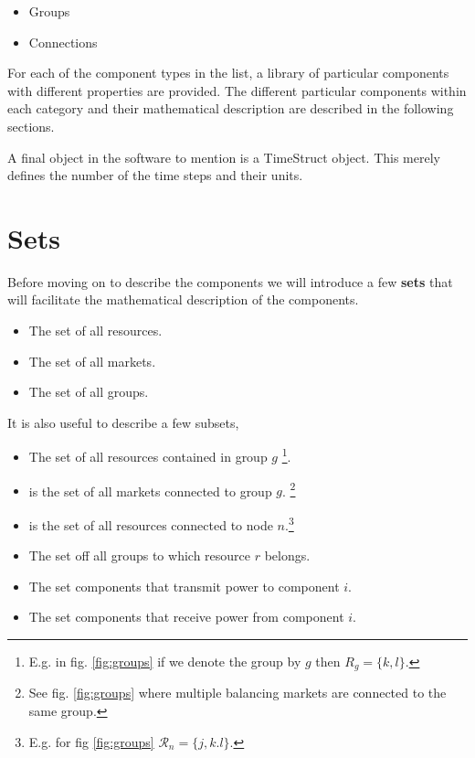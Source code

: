\documentclass[]{report}
\renewcommand{\emph}{\textbf}
\newcommand{\resources}{\mathcal{R}}
\newcommand{\resourcesg}{\mathcal{R}_g}
\newcommand{\resourcesn}{\mathcal{R}_n}
\newcommand{\componentsr}{\mathcal{C}_r}
\newcommand{\groups}{\mathcal{G}}
\newcommand{\groupsr}{\mathcal{G}_r}
\newcommand{\markets}{\mathcal{M}}
\newcommand{\marketsg}{\mathcal{M}_g}
\newcommand{\outputs}{\mathcal{O}}
\newcommand{\inputs}{\mathcal{I}}
\begin{document}
\begin{itemize}
    \item Groups 
    \item Connections
\end{itemize}

For each of the component types in the list, a library of particular components with different properties are provided. The different particular components within each category and their mathematical description are described in the following sections.

A final object in the software to mention is a TimeStruct object. This merely defines the number of the time steps and their units. 

\section{Sets}

Before moving on to describe the components we will introduce a few \emph{sets} that will facilitate the mathematical description of the components.

\begin{itemize}
    \item [$\resources$] The set of all resources.
    \item [$\markets$] The set of all markets.
    \item [$\groups$] The set of all groups.
\end{itemize}

It is also useful to describe a few subsets,

\begin{itemize}
    \item [$\resourcesg$] The set of all resources contained in group $g$ \footnote{E.g. in fig. \ref{fig:groups} if we denote the group by $g$ then $R_g = \{k,l\}$.}.
    \item [$\marketsg$] is the set of all markets connected to group $g$. \footnote{See fig. \ref{fig:groups} where multiple balancing markets are connected to the same group.}
    \item [$\resourcesn$] is the set of all resources connected to node $n$.\footnote{E.g. for fig \ref{fig:groups} $\resourcesn = \{j,k.l\}$.}
    \item [$\groupsr$] The set off all groups to which resource $r$ belongs.
    \item [$\inputs_i$] The set components that transmit power to component $i$. 
    \item [$\outputs_i$] The set components that receive power from component $i$.
\end{itemize}
\end{document}
